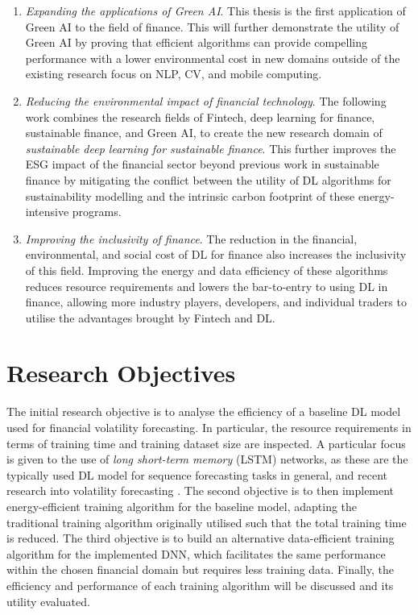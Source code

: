 \documentclass[a4paper, 11pt]{report}
\begin{document}
    \begin{enumerate}
        \item \emph{Expanding the applications of Green AI}. This thesis is the first application of Green AI to the field of finance. This will further demonstrate the utility of Green AI by proving that efficient algorithms can provide compelling performance with a lower environmental cost in new domains outside of the existing research focus on NLP, CV, and mobile computing.
        \item \emph{Reducing the environmental impact of financial technology}. The following work combines the research fields of Fintech, deep learning for finance, sustainable finance, and Green AI, to create the new research domain of \emph{sustainable deep learning for sustainable finance}. This further improves the ESG impact of the financial sector beyond previous work in sustainable finance by mitigating the conflict between the utility of DL algorithms for sustainability modelling and the intrinsic carbon footprint of these energy-intensive programs.
        \item \emph{Improving the inclusivity of finance}. The reduction in the financial, environmental, and social cost of DL for finance also increases the inclusivity of this field. Improving the energy and data efficiency of these algorithms reduces resource requirements and lowers the bar-to-entry to using DL in finance, allowing more industry players, developers, and individual traders to utilise the advantages brought by Fintech and DL.
    \end{enumerate}


    \section{Research Objectives}

    The initial research objective is to analyse the efficiency of a baseline DL model used for financial volatility forecasting. In particular, the resource requirements in terms of training time and training dataset size are inspected. A particular focus is given to the use of \emph{long short-term memory} (LSTM) networks, as these are the typically used DL model for sequence forecasting tasks in general, and recent research into volatility forecasting \citep{xiong-2015}. The second objective is to then implement energy-efficient training algorithm for the baseline model, adapting the traditional training algorithm originally utilised such that the total training time is reduced. The third objective is to build an alternative data-efficient training algorithm for the implemented DNN, which facilitates the same performance within the chosen financial domain but requires less training data. Finally, the efficiency and performance of each training algorithm will be discussed and its utility evaluated.
\end{document}
